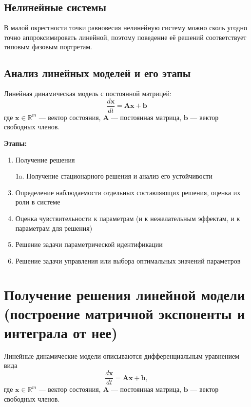 	\subsection{Нелинейные системы}
	В малой окрестности точки равновесия нелинейную систему можно сколь угодно точно аппроксимировать линейной, поэтому поведение её решений соответствует типовым фазовым портретам.
	
	\subsection{Анализ линейных моделей и его этапы}
	
	Линейная динамическая модель с постоянной матрицей:
	\[
		\frac{d \mathbf{x}}{dt} = \mathbf{A} \mathbf{x} + \mathbf{b}
	\]
	где \(\mathbf{x} \in \mathbb{R}^m\) — вектор состояния, \(\mathbf{A}\) — постоянная матрица, \(\mathbf{b}\) — вектор свободных членов.
	\par
	\textbf{Этапы:}
	\begin{enumerate}[label=\arabic*.]
		\item Получение решения
		\item[1a.] Получение стационарного решения и анализ его устойчивости
		\item Определение наблюдаемости отдельных составляющих решения, оценка их роли в системе
		\item Оценка чувствительности к параметрам (и к нежелательным эффектам, и к параметрам для решения)
		\item Решение задачи параметрической идентификации
		\item Решение задачи управления или выбора оптимальных значений параметров
	\end{enumerate}
	
	\newpage
	
	\section{Получение решения линейной модели (построение матричной экспоненты и интеграла от нее)}
	
	Линейные динамические модели описываются дифференциальным уравнением вида
	\begin{equation}
		\frac{d \mathbf{x}}{d t} = \mathbf{A} \mathbf{x} + \mathbf{b},
	\end{equation}
	где \(\mathbf{x} \in \mathbb{R}^m\) — вектор состояния, \(\mathbf{A}\) — постоянная матрица, \(\mathbf{b}\) — вектор свободных членов.
	\par
